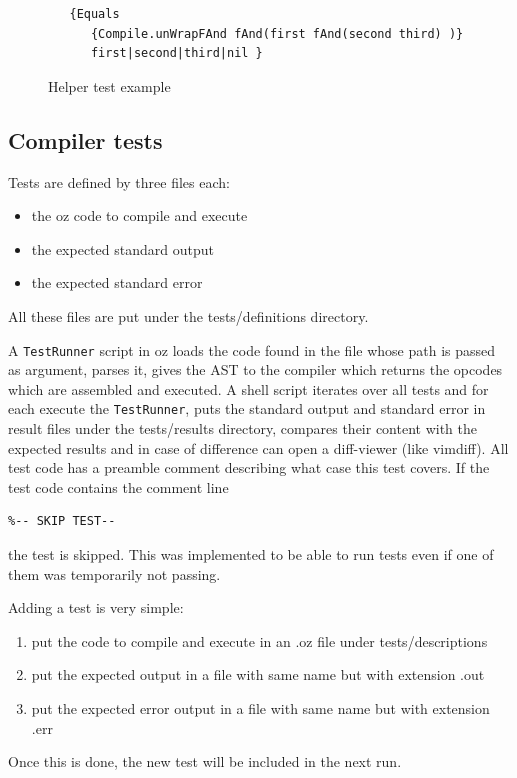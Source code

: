 \documentclass[a4paper]{memoir}
\begin{document}
\begin{figure}
\begin{lstlisting}
   {Equals 
      {Compile.unWrapFAnd fAnd(first fAnd(second third) )}
      first|second|third|nil }
\end{lstlisting}
\caption{Helper test example}
\label{fig:helperstestsexample}
\end{figure}
\subsection{Compiler tests}
Tests are defined by three files each:
\begin{itemize}
  \item the oz code to compile and execute
  \item the expected standard output
  \item the expected standard error
\end{itemize}
All these files are put under the tests/definitions directory.

A \lstinline!TestRunner! script in oz loads the code found in the file whose path is passed as argument, parses it, gives the AST to the compiler which returns the opcodes which are assembled and executed. 
A shell script iterates over all tests and for each execute the
\lstinline!TestRunner!, puts the standard output and standard error in result
files under the tests/results directory, compares their content with the
expected results and in case of difference can open a diff-viewer (like vimdiff).
All test code has a preamble comment describing what case this test covers.
If the test code contains the comment line
\begin{lstlisting}
%-- SKIP TEST-- 
\end{lstlisting}
the test is skipped. This was implemented to be able to run tests even if one of them was temporarily not passing.

Adding a test is very simple:
\begin{enumerate}
  \item put the code to compile and execute in an .oz file under tests/descriptions
  \item put the expected output in a file with same name but with extension .out
  \item put the expected error output in a file with same name but with extension .err
\end{enumerate}
Once this is done, the new test will be included in the next run.
\end{document}
